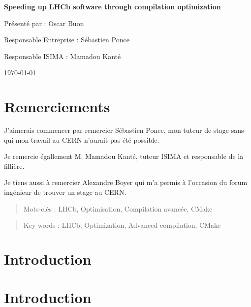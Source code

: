 \documentclass[a4paper,12pt]{report}
\begin{document}
\begin{titlepage}
	\vfill

	{\huge\bfseries Speeding up LHCb software through compilation optimization \par}

	\vfill

	{\Large Présenté par : Oscar Buon \par}

	\vfill

	Responsable Entreprise : Sébastien Ponce \par
	Responsable ISIMA : Mamadou Kanté

	\vfill

	\today
\end{titlepage}


\chapter*{Remerciements}
    J'aimerais commencer par remercier Sébastien Ponce, mon tuteur de stage sans qui mon travail au CERN n'aurait pas été possible.

    Je remercie égallement M. Mamadou Kanté, tuteur ISIMA et responsable de la fillière.

    \bigskip
    Je tiens aussi à remercier Alexandre Boyer qui m'a permis à l'occasion du forum ingénieur de trouver un stage au CERN.

\tableofcontents

\listoffigures


\begin{abstract}

    \vfill

    Mots-clés : LHCb, Optimisation, Compilation avancée, CMake

\end{abstract}

\begin{otherlanguage}{english}
\begin{abstract}

    \vfill

    Key words : LHCb, Optimization, Advanced compilation, CMake
\end{abstract}
\end{otherlanguage}


\chapter*{Introduction}


\chapter{Introduction}
\end{document}
